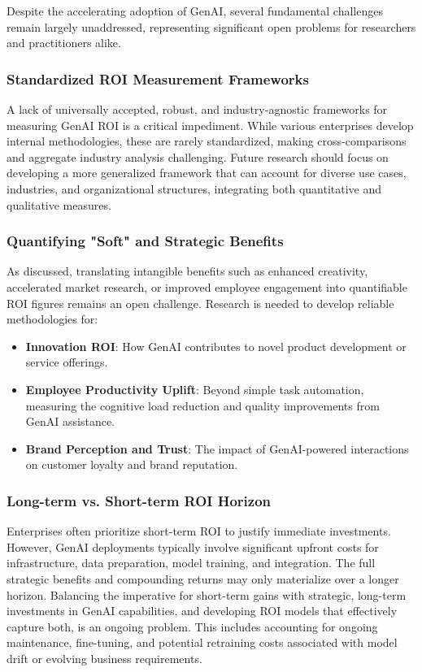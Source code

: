 \documentclass[10pt,twocolumn,letterpaper]{article}
\begin{document}
Despite the accelerating adoption of GenAI, several fundamental challenges remain largely unaddressed, representing significant open problems for researchers and practitioners alike.


\subsubsection{Standardized ROI Measurement Frameworks}

A lack of universally accepted, robust, and industry-agnostic frameworks for measuring GenAI ROI is a critical impediment. While various enterprises develop internal methodologies, these are rarely standardized, making cross-comparisons and aggregate industry analysis challenging. Future research should focus on developing a more generalized framework that can account for diverse use cases, industries, and organizational structures, integrating both quantitative and qualitative measures.


\subsubsection{Quantifying "Soft" and Strategic Benefits}

As discussed, translating intangible benefits such as enhanced creativity, accelerated market research, or improved employee engagement into quantifiable ROI figures remains an open challenge. Research is needed to develop reliable methodologies for:
\begin{itemize}
  \item \textbf{Innovation ROI}: How GenAI contributes to novel product development or service offerings.
  \item \textbf{Employee Productivity Uplift}: Beyond simple task automation, measuring the cognitive load reduction and quality improvements from GenAI assistance.
  \item \textbf{Brand Perception and Trust}: The impact of GenAI-powered interactions on customer loyalty and brand reputation.
\end{itemize}


\subsubsection{Long-term vs. Short-term ROI Horizon}

Enterprises often prioritize short-term ROI to justify immediate investments. However, GenAI deployments typically involve significant upfront costs for infrastructure, data preparation, model training, and integration. The full strategic benefits and compounding returns may only materialize over a longer horizon. Balancing the imperative for short-term gains with strategic, long-term investments in GenAI capabilities, and developing ROI models that effectively capture both, is an ongoing problem. This includes accounting for ongoing maintenance, fine-tuning, and potential retraining costs associated with model drift or evolving business requirements.
\end{document}
